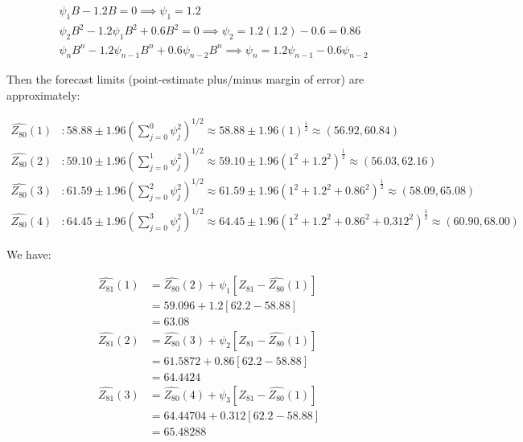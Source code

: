 \documentclass[12pt, letterpaper]{article}
\theoremstyle{definition}
\numberwithin{equation}{section}
\newcommand{\+}[1]{+_{\scalebox{.375}{#1}}}
\newcommand{\1}{\mathbbm{1}}
\begin{document}
\vspace{-0.5cm}
\begin{align*}
	&\psi_1B-1.2B=0 \implies \psi_1=1.2\\
	&\psi_2B^2-1.2\psi_1B^2+0.6B^2=0 \implies \psi_2=1.2(1.2)-0.6=0.86\\
	&\psi_nB^n-1.2\psi_{n-1}B^{n}+0.6\psi_{n-2}B^{n} \implies \psi_n=1.2\psi_{n-1}-0.6\psi_{n-2}
\end{align*}

Then the forecast limits (point-estimate plus/minus margin of error) are approximately:

\vspace{-0.5cm}
\begin{align*}
	\widehat{Z_{80}}(1)&: 58.88 \pm 1.96 \left(\sum_{j=0}^{0}\psi_j^2\right)^{1/2} \approx 58.88 \pm 1.96 \left(1\right)^{\frac{1}{2}}\approx(56.92, 60.84)\\
	\widehat{Z_{80}}(2)&: 59.10 \pm 1.96 \left(\sum_{j=0}^{1}\psi_j^2\right)^{1/2}\approx 59.10 \pm 1.96 \left(1^2+1.2^2\right)^{\frac{1}{2}}\approx(56.03, 62.16)\\
	\widehat{Z_{80}}(3)&: 61.59 \pm 1.96 \left(\sum_{j=0}^{2}\psi_j^2\right)^{1/2}\approx 61.59 \pm 1.96 \left(1^2+1.2^2+0.86^2\right)^{\frac{1}{2}}\approx(58.09, 65.08)\\
	\widehat{Z_{80}}(4)&: 64.45 \pm 1.96 \left(\sum_{j=0}^{3}\psi_j^2\right)^{1/2}\approx 64.45 \pm 1.96 \left(1^2+1.2^2+0.86^2+0.312^2\right)^{\frac{1}{2}}\approx(60.90, 68.00)
\end{align*}



\vspace{\baselineskip}
\noindent\textbf{}
\vspace{\baselineskip}

We have:

\vspace{-0.5cm}
\begin{align*}
	\widehat{Z_{81}}(1)&=\widehat{Z_{80}}(2)+\psi_1\left[Z_{81}-\widehat{Z_{80}}(1)\right]\\
	&=59.096+1.2\left[62.2-58.88\right]\\
	&=63.08\\
	\widehat{Z_{81}}(2)&=\widehat{Z_{80}}(3)+\psi_2\left[Z_{81}-\widehat{Z_{80}}(1)\right]\\
	&=61.5872+0.86\left[62.2-58.88\right]\\
	&=64.4424\\
	\widehat{Z_{81}}(3)&=\widehat{Z_{80}}(4)+\psi_3\left[Z_{81}-\widehat{Z_{80}}(1)\right]\\
	&=64.44704+0.312\left[62.2-58.88\right]\\
	&=65.48288
\end{align*}
\end{document}
